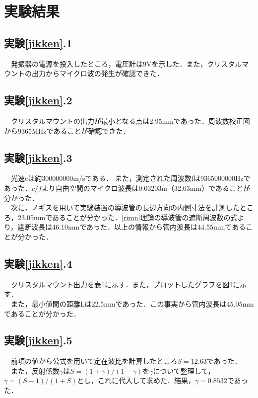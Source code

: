 \section{実験結果}
\subsection{実験\ref{jikken}.1}
　発振器の電源を投入したところ，電圧計は9Vを示した．また，クリスタルマウントの出力からマイクロ波の発生が確認できた．

\subsection{実験\ref{jikken}.2}
　クリスタルマウントの出力が最小となる点は2.95mmであった．周波数校正図から9365MHzであることが確認できた．

\subsection{実験\ref{jikken}.3}
　光速cは約300000000m/sである． また，測定された周波数fは9365000000Hzであった．$c/f$より自由空間のマイクロ波長は0.03203m（32.03mm）であることが分かった．\\
　次に，ノギスを用いて実験装置の導波管の長辺方向の内側寸法を計測したところ，23.05mmであることが分かった．\ref{riron}理論の導波管の遮断周波数の式より，遮断波長は46.10mmであった．以上の情報から管内波長は44.55mmであることが分かった．

\subsection{実験\ref{jikken}.4}
　クリスタルマウント出力を表1に示す．また，プロットしたグラフを図1に示す．\\
　また，最小値間の距離Lは22.5mmであった．この事実から管内波長は45.05mmであることが分かった．

\subsection{実験\ref{jikken}.5}
　前項の値から公式を用いて定在波比を計算したところ$S=12.63$であった．\\
　また，反射係数$\gamma$は$S=(1+\gamma)/(1-\gamma)$を$\gamma$について整理して，$\gamma=(S-1)/(1+S)$とし，これに代入して求めた．結果，$\gamma=0.8532$であった．

